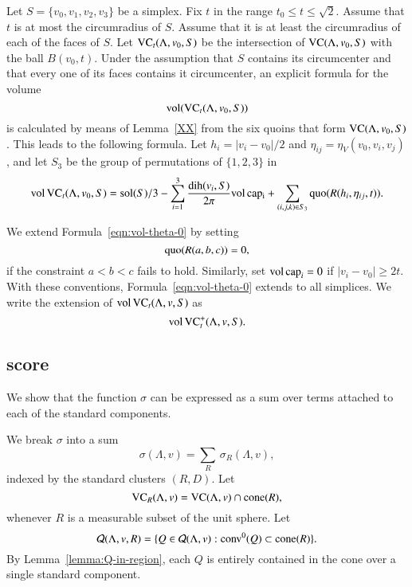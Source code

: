  Let $S=\{v_0,v_1,v_2,v_3\}$ be a simplex. Fix $t$ in the range
$t_0\le t\le\sqrt2$.  Assume that $t$ is at most the circumradius
of $S$. Assume that it is at least the circumradius of each of the
faces of $S$.  Let ${\operatorname{VC}}_t(\Lambda,v_0,S)$ be the intersection of
${\operatorname{VC}}(\Lambda,v_0,S)$ with the ball $B(v_0,t)$. Under the assumption
that $S$ contains its circumcenter and that every one of its faces
contains it circumcenter, an explicit formula for the volume
$${\operatorname{vol}}({\operatorname{VC}}_t(\Lambda,v_0,S))$$ is calculated by means of
Lemma~\ref{XX} from the six quoins that form ${\operatorname{VC}}(\Lambda,v_0,S)$.
This leads to the
following formula. Let $h_i = |v_i-v_0|/2$ and
$\eta_{ij}=\eta_V(v_0,v_i,v_j)$, and let $S_3$ be the group of
permutations of $\{1,2,3\}$ in
\begin{equation}
   \op{vol}\,\op{VC}_t(\Lambda,v_0,S) =
   \sol(S)/3 - \sum_{i=1}^3 \frac{\dih(v_i,S)}{2\pi}\op{vol}\,\op{cap_i}
   +\sum_{(i,j,k)\in S_3} \quo(R(h_i,\eta_{ij},t)).
   \tlabel{eqn:vol-theta-0}
\end{equation}


We extend Formula~\ref{eqn:vol-theta-0} by setting
    $$\operatorname{quo}(R(a,b,c)) = 0,$$
if the constraint $a < b < c$ fails to hold.  Similarly, set
${\operatorname{vol}}\,{\operatorname{cap}}_i=0$ if $|v_i-v_0|\ge 2t$.  With these
conventions,  Formula~\ref{eqn:vol-theta-0} extends to all
simplices.  We write the extension of ${\operatorname{vol}}\,{\operatorname{VC}}_t(\Lambda,v,S)$
as
$${\operatorname{vol}}\,{{\operatorname{VC}}^+_t}(\Lambda,v,S).$$


\subsection{score}

We show that the function $\sigma$ can be expressed as a sum over
terms attached to each of the standard components.




We break $\sigma$ into a sum
   \begin{equation}
   \sigma(\Lambda,v) = \sum_R\,\sigma_R(\Lambda,v),
   \end{equation}
indexed by the standard clusters $(R,D)$.  Let
   $$
   {\operatorname{VC}}_R(\Lambda,v) = {\operatorname{VC}}(\Lambda,v)\cap {\operatorname{cone}}(R),
   $$
whenever $R$ is a measurable subset of the unit sphere.  Let
   $$
   {\mathcal Q}(\Lambda,v,R) = \{Q\in {\mathcal Q}(\Lambda,v) : {\operatorname{conv}}^0(Q)\subset {\operatorname{cone}}(R)\}.
   $$
By Lemma~\ref{lemma:Q-in-region},
 each $Q$ is entirely contained in the cone over a single
standard component.

